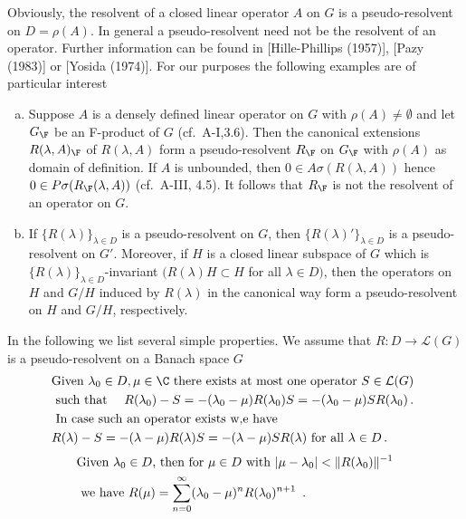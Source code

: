 Obviously, the resolvent of a closed linear operator $A$ on $G$ is a pseudo-resolvent on $D = \rho(A)$.
In general a pseudo-resolvent need not be the resolvent of an operator.
Further information can be found in [Hille-Phillips (1957)], [Pazy (1983)] or [Yosida (1974)].
For our purposes the following examples are of particular interest

\begin{example}\label{ex:c3-2.5}
	\begin{enumerate}[(a), wide]
		\item 
		Suppose $A$ is a densely defined linear operator on $G$ with $\rho(A) \neq \emptyset$ and let $G_{\F}$ be an F-product of $G$ (cf.\ A-I,3.6).
		Then the canonical extensions $R(\lambda,A)_{\F}$ of $R(\lambda,A)$ form a pseudo-resolvent $R_{\F}$ on $G_{\F}$ with $\rho(A)$ as domain of definition.
		If $A$ is unbounded, then $0 \in A\sigma(R(\lambda,A))$ hence $0 \in P\sigma(R_{\F}(\lambda,A))$ (cf.\ A-III, 4.5).
		It follows that $R_{\F}$ is not the resolvent of an operator on $G$.
		
		\item 
		If $\{R(\lambda)\}_{\lambda\in D}$ is a pseudo-resolvent on $G$, then $\{R(\lambda)'\}_{\lambda\in D}$ is a pseudo-resolvent on $G'$.
		Moreover, if $H$ is a closed linear subspace of $G$ which is $\{R(\lambda)\}_{\lambda\in D}$-invariant $(R(\lambda)H \subset H$ for all $\lambda \in D)$, then the operators on $H$ and $G/H$ induced by $R(\lambda)$ in the canonical way form a pseudo-resolvent on $H$ and $G/H$, respectively.
	\end{enumerate}
\end{example}

In the following we list several simple properties.
We assume that $R \colon D \to \mathcal{L}(G)$ is a pseudo-resolvent on a Banach space $G$
\begin{equation}\label{eq:c3-2.10}
	\begin{aligned}
	&\text{Given  $\lambda_{0} \in D, \mu \in \C $  there exists at most one operator  $S \in \mathcal{L}(G)$ }\\
	&\text{ such that \quad $R(\lambda_{0}) - S = -(\lambda_{0}-\mu)R(\lambda_{0})S = -(\lambda_{0}-\mu)SR(\lambda_{0})$}\,.\\
	&\text{ In case such an operator exists w,e have} \\
	&\text{$R(\lambda) - S = -(\lambda-\mu)R(\lambda)S = -(\lambda-\mu)SR(\lambda)$ for all $\lambda \in D$}\,.
	\end{aligned}
\end{equation}
%
\begin{equation}\label{eq:c3-2.11}
	\begin{aligned}
	&\text{Given  $\lambda_{0} \in D$,  then for  $\mu \in D$  with  $|\mu-\lambda_{0}| < \|R(\lambda_{0})\|^{-1}$}\\ 
	&\text{ we have $ R(\mu) = \sum_{n=0}^{\infty} (\lambda_{0}-\mu)^n R(\lambda_{0})^{n+1}$ }\,.
	\end{aligned}
\end{equation}

